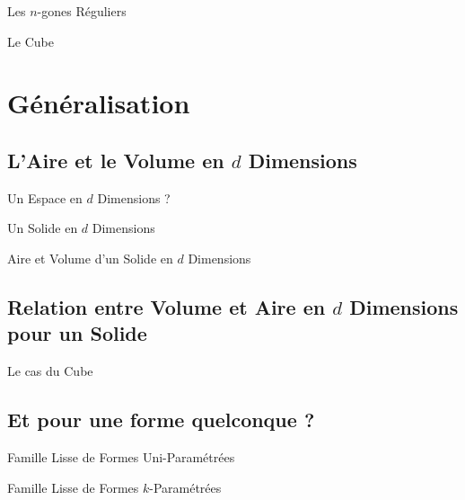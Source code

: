 \documentclass{beamercours}
\begin{document}
            \begin{frame}{Les $n$-gones Réguliers}
                
            \end{frame}

            \begin{frame}{Le Cube}
                
            \end{frame}

    \section{Généralisation}
        \subsection{L'Aire et le Volume en $d$ Dimensions}
            \begin{frame}{Un Espace en $d$ Dimensions ?}
                
            \end{frame}

            \begin{frame}{Un Solide en $d$ Dimensions}
                
            \end{frame}

            \begin{frame}{Aire et Volume d'un Solide en $d$ Dimensions}
                
            \end{frame}

        \subsection{Relation entre Volume et Aire en $d$ Dimensions pour un Solide}
            \begin{frame}{Le cas du Cube}
                
            \end{frame}


        \subsection{Et pour une forme quelconque ?}
            \begin{frame}{Famille Lisse de Formes Uni-Paramétrées}
                
            \end{frame}

            \begin{frame}{Famille Lisse de Formes $k$-Paramétrées}
                
            \end{frame}
\end{document}
